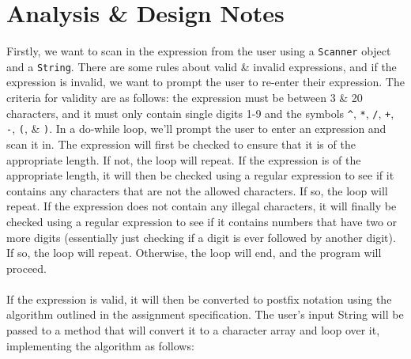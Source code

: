 \documentclass[a4paper]{article}
\begin{document}
\section{Analysis \& Design Notes}
Firstly, we want to scan in the expression from the user using a \verb|Scanner| object and a \verb|String|. 
There are some rules about valid \& invalid expressions, and if the expression is invalid, we want to prompt the user to re-enter 
their expression. 
The criteria for validity are as follows: the expression must be between 3 \& 20 characters, and it must only contain single 
digits 1-9 and the symbols \verb|^|, \verb|*|, \verb|/|, \verb|+|, \verb|-|, \verb|(|, \& \verb|)|.  
In a do-while loop, we'll prompt the user to enter an expression and scan it in. 
The expression will first be checked to ensure that it is of the appropriate length. 
If not, the loop will repeat. 
If the expression is of the appropriate length, it will then be checked using a regular expression to see if it contains any 
characters that are not the allowed characters.
If so, the loop will repeat. 
If the expression does not contain any illegal characters, it will finally be checked using a regular expression to see if it 
contains numbers that have two or more digits (essentially just checking if a digit is ever followed by another digit). 
If so, the loop will repeat. 
Otherwise, the loop will end, and the program will proceed.
\\\\
If the expression is valid, it will then be converted to postfix notation using the algorithm outlined in the assignment 
specification.
The user's input String will be passed to a method that will convert it to a character array and loop over it, 
implementing the algorithm as follows:
\end{document}
